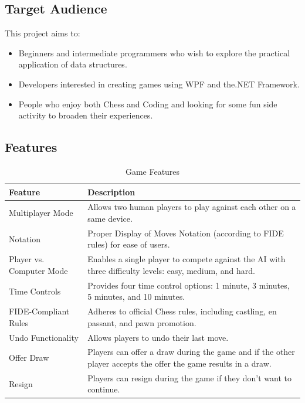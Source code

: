 \documentclass[a4paper,12pt]{article}
\begin{document}
\subsection{Target Audience}
This project aims to:
\begin{itemize}
    \item Beginners and intermediate programmers who wish to explore the practical application of data structures.
    \item Developers interested in creating games using WPF and the.NET Framework.
    \item People who enjoy both Chess and Coding and looking for some fun side activity to broaden their experiences.
\end{itemize}

\subsection{Features}
\begin{longtable}{|p{}|p{}|}
    \caption{Game Features}
    \hline
    \textbf{Feature} & \textbf{Description} \\
    \hline
    Multiplayer Mode & Allows two human players to play against each other on a same device. \\
    \hline
    Notation & Proper Display of Moves Notation (according to FIDE rules) for ease of users. \\
    \hline
    Player vs. Computer Mode & Enables a single player to compete against the AI with three difficulty levels: easy, medium, and hard. \\
    \hline
    Time Controls & Provides four time control options: 1 minute, 3 minutes, 5 minutes, and 10 minutes. \\
    \hline
    FIDE-Compliant Rules & Adheres to official Chess rules, including castling, en passant, and pawn promotion. \\
    \hline
    Undo Functionality & Allows players to undo their last move. \\
    \hline
    Offer Draw & Players can offer a draw during the game and if the other player accepts the offer the game results in a draw. \\
    \hline
    Resign & Players can resign during the game if they don't want to continue. \\
    \hline
\end{longtable}
\end{document}
